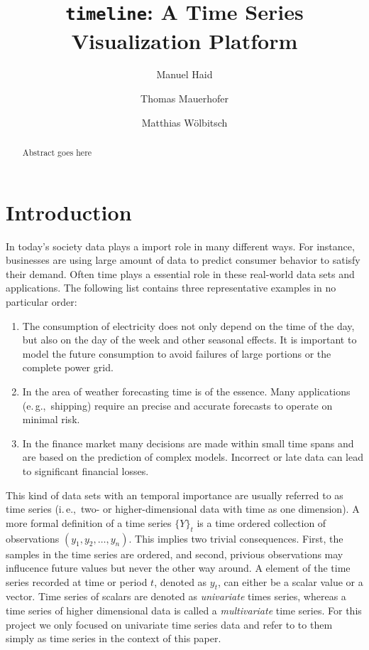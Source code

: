\documentclass[runningheads,a4paper]{llncs}
\newcommand{\eg}{e.\,g.,\ }
\newcommand{\ie}{i.\,e.,\ }
\begin{document}


\title{\texttt{timeline}: A Time Series Visualization Platform}
\author{Manuel Haid \and Thomas Mauerhofer \and Matthias W\"olbitsch}

\maketitle

\begin{abstract}
Abstract goes here
\end{abstract}


\section{Introduction}\label{sec:intro}

In today's society data plays a import role in many different ways.
For instance, businesses are using large amount of data to predict consumer behavior to satisfy their demand.
Often time plays a essential role in these real-world data sets and applications. 
The following list contains three representative examples in no particular order:

\begin{enumerate}
 \item The consumption of electricity does not only depend on the time of the day, but also on the day of the week and other seasonal effects.
 It is important to model the future consumption to avoid failures of large portions or the complete power grid.
 \item In the area of weather forecasting time is of the essence. 
 Many applications (\eg shipping) require an precise and accurate forecasts to operate on minimal risk.
 \item In the finance market many decisions are made within small time spans and are based on the prediction of complex models.
 Incorrect or late data can lead to significant financial losses.
\end{enumerate}


This kind of data sets with an temporal importance are usually referred to as time series (\ie two- or higher-dimensional data with time as one dimension). 
A more formal definition \cite{Cortez2012} of a time series \(\{Y\}_t\) is a time ordered collection of observations \((y_1, y_2, \ldots, y_n)\).
This implies two trivial consequences. 
First, the samples in the time series are ordered, and second, privious observations may influcence future values but never the other way around.
A element of the time series recorded at time or period \(t\), denoted as \(y_t\), can either be a scalar value or a vector.
Time series of scalars are denoted as \emph{univariate} times series, whereas a time series of higher dimensional data is called a \emph{multivariate} time series.
For this project we only focused on univariate time series data and refer to to them simply as time series in the context of this paper.
\end{document}
